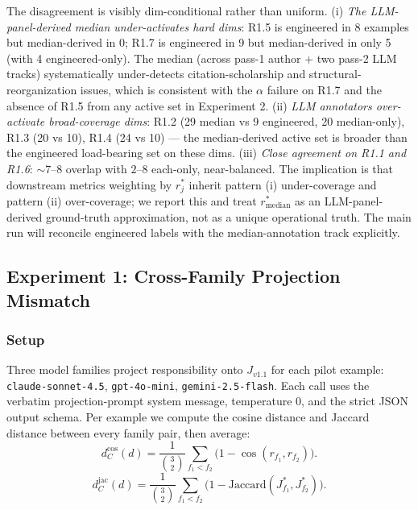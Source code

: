 The disagreement is visibly dim-conditional rather than uniform. (i) \emph{The LLM-panel-derived median under-activates hard dims}: R1.5 is engineered in 8 examples but median-derived in 0; R1.7 is engineered in 9 but median-derived in only 5 (with 4 engineered-only). The median (across pass-1 author + two pass-2 LLM tracks) systematically under-detects citation-scholarship and structural-reorganization issues, which is consistent with the $\alpha$ failure on R1.7 and the absence of R1.5 from any active set in Experiment 2. (ii) \emph{LLM annotators over-activate broad-coverage dims}: R1.2 (29 median vs 9 engineered, 20 median-only), R1.3 (20 vs 10), R1.4 (24 vs 10) --- the median-derived active set is broader than the engineered load-bearing set on these dims. (iii) \emph{Close agreement on R1.1 and R1.6}: $\sim 7$--$8$ overlap with $2$--$8$ each-only, near-balanced. The implication is that downstream metrics weighting by $r^*_j$ inherit pattern (i) under-coverage and pattern (ii) over-coverage; we report this and treat $r^*_{\text{median}}$ as an LLM-panel-derived ground-truth approximation, not as a unique operational truth. The main run will reconcile engineered labels with the median-annotation track explicitly.


\subsection{Experiment 1: Cross-Family Projection Mismatch}
\label{sec:results:exp1}

\subsubsection{Setup}
Three model families project responsibility onto $J_{v1.1}$ for each pilot example: \texttt{claude-sonnet-4.5}, \texttt{gpt-4o-mini}, \texttt{gemini-2.5-flash}. Each call uses the verbatim projection-prompt system message, temperature 0, and the strict JSON output schema. Per example we compute the cosine distance and Jaccard distance between every family pair, then average:
\begin{equation}
d_C^{\cos}(d) = \frac{1}{\binom{3}{2}} \sum_{f_1 < f_2} \bigl( 1 - \cos(r_{f_1}, r_{f_2}) \bigr).
\label{eq:dc_cos}
\end{equation}
\begin{equation}
d_C^{\text{jac}}(d) = \frac{1}{\binom{3}{2}} \sum_{f_1 < f_2} \bigl( 1 - \mathrm{Jaccard}(J^*_{f_1}, J^*_{f_2}) \bigr).
\label{eq:dc_jac}
\end{equation}

